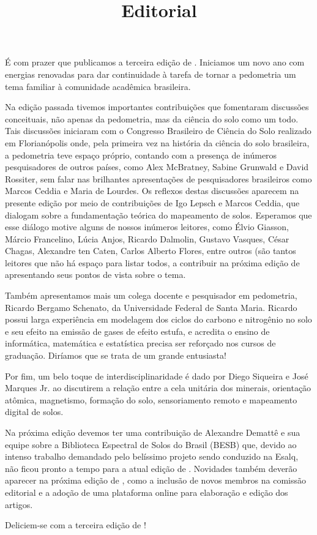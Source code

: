 \title{Editorial}
\maketitle

É com prazer que publicamos a terceira edição de \pedometria. Iniciamos um novo ano com energias renovadas para dar continuidade à tarefa de tornar a pedometria um tema familiar à comunidade acadêmica brasileira.

Na edição passada tivemos importantes contribuições que fomentaram discussões conceituais, não apenas da pedometria, mas da ciência do solo como um todo. Tais discussões iniciaram com o Congresso Brasileiro de Ciência do Solo realizado em Florianópolis onde, pela primeira vez na história da ciência do solo brasileira, a pedometria teve espaço próprio, contando com a presença de inúmeros pesquisadores de outros países, como Alex McBratney, Sabine Grunwald e David Rossiter, sem falar nas brilhantes apresentações de pesquisadores brasileiros como Marcos Ceddia e Maria de Lourdes. Os reflexos destas discussões aparecem na presente edição por meio de contribuições de Igo Lepsch e Marcos Ceddia, que dialogam sobre a fundamentação teórica do mapeamento de solos. Esperamos que esse diálogo motive alguns de nossos inúmeros leitores, como Élvio Giasson, Márcio Francelino, Lúcia Anjos, Ricardo Dalmolin, Gustavo Vasques, César Chagas, Alexandre ten Caten, Carlos Alberto Flores, entre outros (são tantos leitores que não há espaço para listar todos, a contribuir na próxima edição de \pedometria{} apresentando seus pontos de vista sobre o tema.

Também apresentamos mais um colega docente e pesquisador em pedometria, Ricardo Bergamo Schenato, da Universidade Federal de Santa Maria. Ricardo possui larga experiência em modelagem dos ciclos do carbono e nitrogênio no solo e seu efeito na emissão de gases de efeito estufa, e acredita o ensino de informática, matemática e estatística precisa ser reforçado nos cursos de graduação. Diríamos que se trata de um grande entusiasta!

Por fim, um belo toque de interdisciplinaridade é dado por Diego Siqueira e José Marques Jr. ao discutirem a relação entre a cela unitária dos minerais, orientação atômica, magnetismo, formação do solo, sensoriamento remoto e mapeamento digital de solos.

Na próxima edição devemos ter uma contribuição de Alexandre Demattê e sua equipe sobre a Biblioteca Espectral de Solos do Brasil (BESB) que, devido ao intenso trabalho demandado pelo belíssimo projeto sendo conduzido na Esalq, não ficou pronto a tempo para a atual edição de \pedometria. Novidades também deverão aparecer na próxima edição de \pedometria, como a inclusão de novos membros na comissão editorial e a adoção de uma plataforma online para elaboração e edição dos artigos.

Deliciem-se com a terceira edição de \pedometria!

